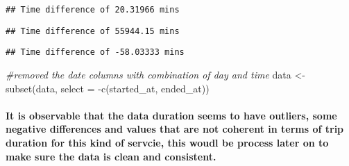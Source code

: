 \documentclass[
]{article}
\newenvironment{Shaded}{\begin{snugshade}}{\end{snugshade}}
\newcommand{\AttributeTok}[1]{\textcolor[rgb]{0.77,0.63,0.00}{#1}}
\newcommand{\CommentTok}[1]{\textcolor[rgb]{0.56,0.35,0.01}{\textit{#1}}}
\newcommand{\FunctionTok}[1]{\textcolor[rgb]{0.00,0.00,0.00}{#1}}
\newcommand{\NormalTok}[1]{#1}
\newcommand{\OtherTok}[1]{\textcolor[rgb]{0.56,0.35,0.01}{#1}}
\newcommand{\SpecialCharTok}[1]{\textcolor[rgb]{0.00,0.00,0.00}{#1}}
\begin{document}
\begin{verbatim}
## Time difference of 20.31966 mins
\end{verbatim}

\begin{Shaded}
\end{Shaded}

\begin{verbatim}
## Time difference of 55944.15 mins
\end{verbatim}

\begin{Shaded}
\end{Shaded}

\begin{verbatim}
## Time difference of -58.03333 mins
\end{verbatim}

\begin{Shaded}
\begin{Highlighting}[]
\CommentTok{\#removed the date columns with combination of day and time}
\NormalTok{data }\OtherTok{\textless{}{-}} \FunctionTok{subset}\NormalTok{(data, }\AttributeTok{select =} \SpecialCharTok{{-}}\FunctionTok{c}\NormalTok{(started\_at, ended\_at))   }
\end{Highlighting}
\end{Shaded}

\hypertarget{it-is-observable-that-the-data-duration-seems-to-have-outliers-some-negative-differences-and-values-that-are-not-coherent-in-terms-of-trip-duration-for-this-kind-of-servcie-this-woudl-be-process-later-on-to-make-sure-the-data-is-clean-and-consistent.}{%
\paragraph{It is observable that the data duration seems to have
outliers, some negative differences and values that are not coherent in
terms of trip duration for this kind of servcie, this woudl be process
later on to make sure the data is clean and
consistent.}\label{it-is-observable-that-the-data-duration-seems-to-have-outliers-some-negative-differences-and-values-that-are-not-coherent-in-terms-of-trip-duration-for-this-kind-of-servcie-this-woudl-be-process-later-on-to-make-sure-the-data-is-clean-and-consistent.}}
\end{document}
